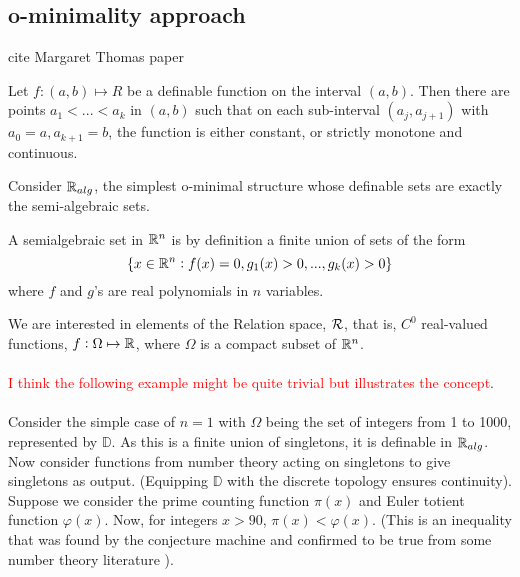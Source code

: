 % 
\subsection{o-minimality approach}

cite Margaret Thomas paper \cite{thomasConvergenceResultsFunction2012}

\begin{theorem}[Monotinicity]
    Let $f:(a,b)\mapsto R$ be a definable function on the interval $(a,b).$ Then there are points $a_1 < ... < a_k$ in $(a,b)$ such that on each sub-interval $(a_j, a_{j+1})$ with $a_0 = a, a_{k+1} = b$, the function is either constant, or strictly monotone and continuous.
\end{theorem}

% 

Consider $\mathbb{R}_{alg}$, the simplest o-minimal structure whose definable sets are exactly the semi-algebraic sets.

\begin{definition}[Semialgebraic]
    A semialgebraic set in $\mathbb{R}^n$ is by definition a finite union of sets of the form
    \begin{equation*}
        \{x\in\mathbb{R}^n : f(x) = 0, g_1(x)>0,...,g_k(x)>0\}
    \end{equation*}
    where $f$ and $g$'s are real polynomials in $n$ variables.
\end{definition}

We are interested in elements of the Relation space, $\mathcal{R}$, that is, $C^0$ real-valued functions, $f:\Omega\mapsto\mathbb{R}$, where $\Omega$ is a compact subset of $\mathbb{R}^n$.
\\\\
\textcolor{red}{I think the following example might be quite trivial but illustrates the concept}.
\\\\
Consider the simple case of $n=1$ with $\Omega$ being the set of integers from 1 to 1000, represented by $\mathbb{D}$.
As this is a finite union of singletons, it is definable in $\mathbb{R}_{alg}$. Now consider functions from number theory acting on singletons to give singletons as output. (Equipping $\mathbb{D}$ with the discrete topology ensures continuity). Suppose we consider the prime counting function $\pi(x)$ and Euler totient function $\varphi(x)$. Now, for integers $x > 90$, $\pi(x) < \varphi(x)$. (This is an inequality that was found by the conjecture machine and confirmed to be true from some number theory literature \cite{moser1951}).

